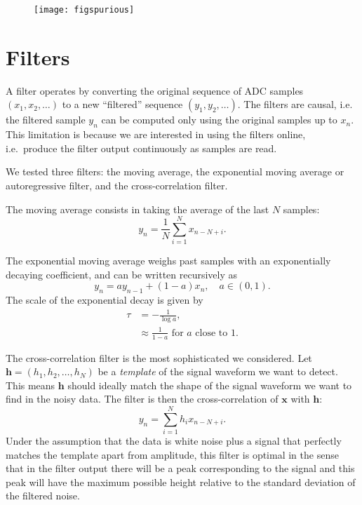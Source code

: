 
\begin{figure}
    \hspace{-0.26\textwidth}\texttt{[image: figspurious]}
    

\end{figure}

\section{Filters}
\label{sec:filters}

A filter operates by converting the original sequence of ADC samples $(x_1,
x_2, \ldots)$ to a new ``filtered'' sequence $(y_1, y_2, \ldots)$. The filters
are causal, i.e. the filtered sample $y_n$ can be computed only using the
original samples up to $x_n$. This limitation is because we are interested in
using the filters online, i.e.\ produce the filter output continuously as
samples are read.

We tested three filters: the moving average, the exponential moving average or
autoregressive filter, and the cross-correlation filter.

The moving average consists in taking the average of the last $N$ samples:
%
\begin{equation}
    y_n =  \frac1N \sum_{i=1}^N x_{n-N+i}.
\end{equation}

The exponential moving average weighs past samples with an exponentially
decaying coefficient, and can be written recursively as
%
\begin{equation}
    y_n = a y_{n-1} + (1 - a) x_n, \quad a \in (0, 1).
\end{equation}
%
The scale of the exponential decay is given by
%
\begin{align}
    \tau &= -\frac1{\log a}, \\
    &\approx \frac1{1-a} \text{ for $a$ close to 1.}
\end{align}

The cross-correlation filter is the most sophisticated we considered. Let
$\mathbf h = (h_1, h_2, \ldots, h_N)$ be a \emph{template} of the signal
waveform we want to detect. This means $\mathbf h$ should ideally match the
shape of the signal waveform we want to find in the noisy data. The filter is
then the cross-correlation of $\mathbf x$ with $\mathbf h$:
%
\begin{equation}
    y_n = \sum_{i=1}^N h_i x_{n-N+i}.
\end{equation}
%
Under the assumption that the data is white noise plus a signal that perfectly
matches the template apart from amplitude, this filter is optimal in the sense
that in the filter output there will be a peak corresponding to the signal and
this peak will have the maximum possible height relative to the standard
deviation of the filtered noise.

